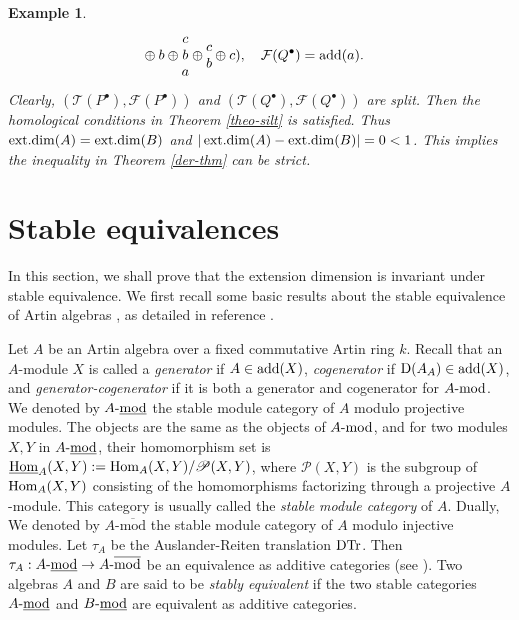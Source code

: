 \documentclass[12pt]{article}
\numberwithin{equation}{section}
\newtheorem{Bsp}[Def]{Example}%
\theoremstyle{definition}
\newcommand{\add}{{\rm add}}
\def\ed{\mathop{\rm ext.dim}\nolimits}
\newcommand{\DD}{{\rm D}}
\newcommand{\DTr}{{\rm DTr}}
\newcommand{\F}{{\mathcal F}}
\newcommand{\T}{{\mathcal T}}
\newcommand{\modcat}{\ensuremath{\mbox{{\rm -mod}}}}
\newcommand{\stmodcat}[1]{#1\mbox{{\rm -{\underline{mod}}}}}
\newcommand{\Hom}{{\rm Hom}}
\newcommand{\ra}{\rightarrow}
\begin{document}
\begin{Bsp}
{$$\begin{matrix}
\end{matrix}\oplus
\begin{matrix}
b
\end{matrix}\oplus
\begin{matrix}
c\\ b \\ a
\end{matrix}\oplus
\begin{matrix}
c\\b
\end{matrix}\oplus
\begin{matrix}
c
\end{matrix}),\quad
\F(Q^{\bullet})=\add(\begin{matrix}
a
\end{matrix}).
$$
Clearly, $(\T(P^{\bullet}),\F(P^{\bullet}))$ and $(\T(Q^{\bullet}),\F(Q^{\bullet}))$ are split. Then the homological conditions in Theorem \ref{theo-silt} is satisfied. Thus $\ed(A)=\ed(B)$ and $|\ed(A)-\ed(B)|=0<1$. This implies the inequality in Theorem \ref{der-thm} can be strict.
}\end{Bsp}


\section{Stable equivalences}
In this section, we shall prove that the extension dimension is invariant under stable equivalence. We first recall some basic results about the stable equivalence of Artin algebras , as detailed in reference \cite{ars97,c21,Guo05}.

Let $A$ be an Artin algebra over a fixed commutative Artin ring $k$. Recall that an $A$-module $X$ is called a \emph{generator} if $A\in\add(X)$, \emph{cogenerator} if $\DD(A_A)\in\add(X)$, and \emph{generator-cogenerator} if it is both a generator and cogenerator for $A\modcat$. We denoted by $\stmodcat{A}$ the stable module category of $A$ modulo projective modules. The objects are the same as the objects of $A\modcat$, and for two modules $X, Y$ in $\stmodcat{A}$, their homomorphism set is $\underline{\Hom}_A(X,Y):=\Hom_A(X,Y)/\mathscr{P}(X,Y)$, where $\mathscr{P}(X,Y)$ is the subgroup of $\Hom_A(X,Y)$ consisting of the homomorphisms factorizing through a projective $A$-module. This category is usually called the \emph{stable module category} of $A$. Dually, We denoted by  $A\mbox{-}\overline{\mbox{mod}}$ the stable module category of $A$ modulo injective modules. Let $\tau_A$ be the Auslander-Reiten translation $\DTr$. Then $\tau_A:\stmodcat{A}\ra A\mbox{-}\overline{\mbox{mod}}$ be an equivalence as additive categories (see \cite[Chapler IV.1]{ars97}). Two algebras $A$ and $B$ are said to be \emph{stably equivalent} if the two stable categories $A\stmodcat$ and $B\stmodcat$ are equivalent as additive categories.
\end{document}
